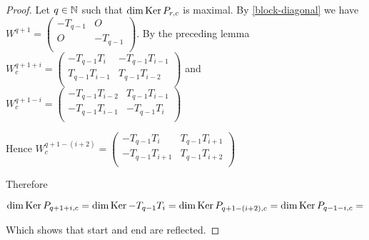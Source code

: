 \begin{proof}
  Let $q\in\mathbb{N}$ such that $\dim\operatorname{Ker} P_{r,c}$ is maximal. By \ref{block-diagonal} we have
  $W^{q+1}=\left(\begin{smallmatrix} -T_{q-1} & O \\ O & -T_{q-1} \\\end{smallmatrix}\right)$.
  By the preceding lemma $W_{c}^{q+1+i} = \left(\begin{array}{cc} -T_{q-1}T_{i} & -T_{q-1}T_{i-1} \\ T_{q-1}T_{i-1} & T_{q-1}T_{i-2} \\\end{array}\right)$
  and $W_{c}^{q+1-i} = \left(\begin{array}{cc} -T_{q-1}T_{i-2} & T_{q-1}T_{i-1} \\ -T_{q-1}T_{i-1} & -T_{q-1}T_{i} \\\end{array}\right)$

  Hence $W_{c}^{q+1-(i+2)}=\left(\begin{array}{cc} -T_{q-1}T_{i} & T_{q-1}T_{i+1} \\ -T_{q-1}T_{i+1} & T_{q-1}T_{i+2} \\\end{array}\right)$

  Therefore

  \[
  \dim\operatorname{Ker} P_{q+1+i,c} =
  \dim\operatorname{Ker} -T_{q-1}T_{i} =
  \dim\operatorname{Ker} P_{q+1-(i+2),c} = 
  \dim\operatorname{Ker} P_{q-1-i,c} = 
  \]

  Which shows that start and end are reflected.
\end{proof}

